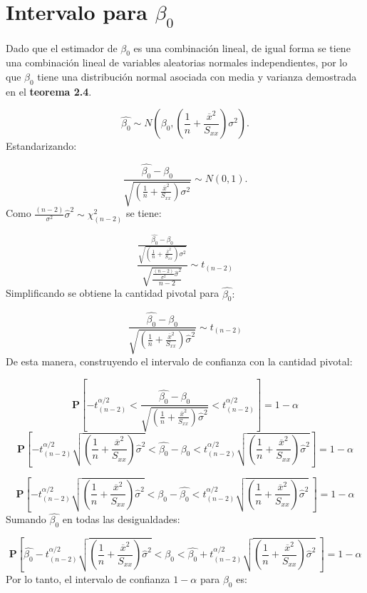 \documentclass[
  a4paper,
  oneside,
  openany]{book}
\begin{document}
\hypertarget{intervalo-para-beta_0}{%
\section{\texorpdfstring{Intervalo para \(\beta_{0}\)}{Intervalo para \textbackslash beta\_\{0\}}}\label{intervalo-para-beta_0}}

Dado que el estimador de \(\beta_{0}\) es una combinación lineal, de igual forma se tiene una combinación lineal de variables aleatorias normales independientes, por lo que \(\beta_{0}\) tiene una distribución normal asociada con media y varianza demostrada en el \textbf{teorema 2.4}.

\[\hat{\beta_{0}} \sim N \left( \beta_{0},\left(\frac{1}{n}+\frac{\overline{x}^2}{S_{xx}}\right)\sigma^2\right).\]
Estandarizando:

\[\frac{\hat{\beta_{0}}-\beta_{0}}{\sqrt{\left(\frac{1}{n}+\frac{\overline{x}^2}{S_{xx}}\right)\sigma^2}}\sim N (0,1).\]
Como \(\frac{(n-2)}{\sigma^2}\hat{\sigma}^2\sim\chi^2_{(n-2)}\) se tiene:

\[\frac{\frac{\hat{\beta_{0}}-\beta_{0}}{\sqrt{\left(\frac{1}{n}+\frac{\overline{x}^2}{S_{xx}}\right)\sigma^2}}}{\sqrt{\frac{\frac{(n-2)}{\sigma^2}\hat{\sigma}^2}{n-2}}}\sim t_{(n-2)}\]
Simplificando se obtiene la cantidad pivotal para \(\hat{\beta_{0}}:\)

\[\frac{\hat{\beta_{0}}-\beta_{0}}{\sqrt{\left(\frac{1}{n}+\frac{\overline{x}^2}{S_{xx}}\right)\hat{\sigma}^2}} \sim t_{(n-2)}\]
De esta manera, construyendo el intervalo de confianza con la cantidad pivotal:

\[\mathbf{P}\left[-t^{\alpha/2}_{(n-2)}<\frac{\hat{\beta_{0}}-\beta_{0}}{\sqrt{\left(\frac{1}{n}+\frac{\overline{x}^2}{S_{xx}}\right)\hat{\sigma}^2}}< t^{\alpha/2}_{(n-2)}\right]=1-\alpha\]
\[\mathbf{P}\left[-t^{\alpha/2}_{(n-2)}\sqrt{\left(\frac{1}{n}+\frac{\overline{x}^2}{S_{xx}}\right)\hat{\sigma}^2}<\hat{\beta_{0}}-\beta_{0}< t^{\alpha/2}_{(n-2)}\sqrt{\left(\frac{1}{n}+\frac{\overline{x}^2}{S_{xx}}\right)\hat{\sigma}^2}\right]=1-\alpha\]

\[\mathbf{P}\left[-t^{\alpha/2}_{(n-2)}\sqrt{\left(\frac{1}{n}+\frac{\overline{x}^2}{S_{xx}}\right)\hat{\sigma}^2}<\beta_{0}-\hat{\beta_{0}}< t^{\alpha/2}_{(n-2)}\sqrt{\left(\frac{1}{n}+\frac{\overline{x}^2}{S_{xx}}\right)\hat{\sigma}^2} \ \right]=1-\alpha\]
Sumando \(\hat{\beta_{0}}\) en todas las desigualdades:

\[\mathbf{P}\left[\hat{\beta_{0}}-t^{\alpha/2}_{(n-2)}\sqrt{\left(\frac{1}{n}+\frac{\overline{x}^2}{S_{xx}}\right)\hat{\sigma}^2}<\beta_{0}< \hat{\beta_{0}}+t^{\alpha/2}_{(n-2)}\sqrt{\left(\frac{1}{n}+\frac{\overline{x}^2}{S_{xx}}\right)\hat{\sigma}^2} \ \right]=1-\alpha\]
Por lo tanto, el intervalo de confianza \(1-\alpha\) para \(\beta_{0}\) es:
\end{document}
